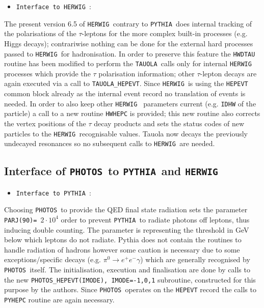 \documentclass[a4paper,12pt]{article}
\newcommand{\pythia}{{\tt PYTHIA }}
\newcommand{\herwig}{{\tt HERWIG }}
\newcommand{\tauola}{{\tt TAUOLA }}
\newcommand{\photos}{{\tt PHOTOS }}
\begin{document}
\begin{itemize}
\item{\tt Interface to \herwig}:
\end{itemize}
The present version 6.5 of \herwig contrary to \pythia does internal tracking of
the polarisations of the $\tau$-leptons for the more complex built-in processes
(e.g. Higgs decays); contrariwise nothing can be done for the external hard
processes passed to \herwig for hadronisation. In order to preserve this feature
the {\tt HWDTAU} routine has been modified to perform the \tauola calls only for
internal \herwig processes which provide the $\tau$ polarisation information; other
$\tau$-lepton decays are again executed via a call to {\tt TAUOLA\_HEPEVT}. Since
\herwig is using the {\tt HEPEVT} common block already as the internal event
record no translation of events is needed. In order to also keep other \herwig
parameters current (e.g. {\tt IDHW} of the particle) a call to a new routine 
{\tt HWHEPC} is provided; this new routine also corrects the vertex positions of
the $\tau$ decay products and sets the status codes of new particles to the
\herwig recognisable values. Tauola now decays the previously
undecayed resonances so no subsequent calls to \herwig are needed. 

\boldmath 
\subsection{Interface of \photos to \pythia and \herwig} 
\unboldmath

\begin{itemize}
\item{\tt Interface to \pythia}:
\end{itemize}

Choosing \photos to provide the QED final state radiation sets the parameter
{\tt PARJ(90)= $2 \cdot 10^{4}$} order to prevent \pythia to radiate photons off leptons,
thus inducing double counting. The parameter is representing the threshold in
GeV below which leptons do not radiate. Pythia does not contain the routines to
handle radiation of hadrons however some caution is necessary due to some
exceptions/specific decays (e.g. $\pi^0 \to e^+ e^- \gamma$) which are 
generally recognised by \photos itself. The initialisation, execution and finalisation
are done by calls to the new {\tt PHOTOS\_HEPEVT(IMODE), IMODE=-1,0,1} subroutine, constructed
for this purpose by the authors. Since \photos operates on the {\tt HEPEVT}
record the calls to {\tt PYHEPC} routine are again necessary.
\end{document}
